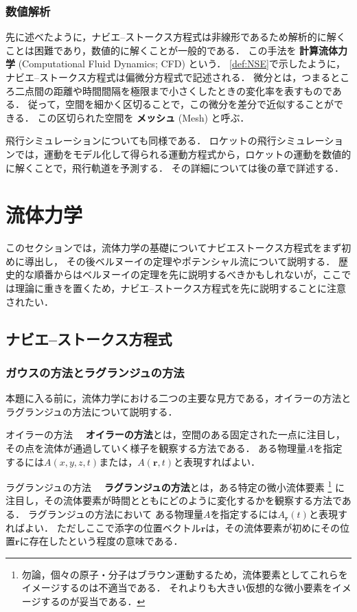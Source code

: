 \documentclass[uplatex,dvipdfmx,a4j,11pt]{jsreport}
\newcommand{\keyword}[1]{\textcolor{mainblue}{\textbf{#1}}}
\numberwithin{equation}{chapter}
\begin{document}
\subsection{数値解析}
先に述べたように，ナビエ--ストークス方程式は非線形であるため解析的に解くことは困難であり，数値的に解くことが一般的である．
この手法を \keyword{計算流体力学} (Computational Fluid Dynamics; CFD) という．
\cref{def:NSE}で示したように，ナビエ--ストークス方程式は偏微分方程式で記述される．
微分とは，つまるところ二点間の距離や時間間隔を極限まで小さくしたときの変化率を表すものである．
従って，空間を細かく区切ることで，この微分を差分で近似することができる．
この区切られた空間を \keyword{メッシュ} (Mesh) と呼ぶ．

\enskip

飛行シミュレーションについても同様である．
ロケットの飛行シミュレーションでは，運動をモデル化して得られる運動方程式から，ロケットの運動を数値的に解くことで，飛行軌道を予測する．
その詳細については後の章で詳述する．


\chapter{流体力学}

このセクションでは，流体力学の基礎についてナビエストークス方程式をまず初めに導出し，
その後ベルヌーイの定理やポテンシャル流について説明する．
歴史的な順番からはベルヌーイの定理を先に説明するべきかもしれないが，ここでは理論に重きを置くため，ナビエ--ストークス方程式を先に説明することに注意されたい．

\section{ナビエ--ストークス方程式}
\subsection{ガウスの方法とラグランジュの方法}
本題に入る前に，流体力学における二つの主要な見方である，オイラーの方法とラグランジュの方法について説明する．

\begin{definition}{オイラーの方法}{}{}
  　\keyword{オイラーの方法}とは，空間のある固定された一点に注目し，その点を流体が通過していく様子を観察する方法である．
  ある物理量$A$を指定するには$A(x,y,z,t)$または，$A(\mathbf{r},t)$と表現すればよい．
\end{definition}

\begin{definition}{ラグランジュの方法}{}{}
  　\keyword{ラグランジュの方法}とは，ある特定の微小流体要素
  \footnote{
  勿論，個々の原子・分子はブラウン運動するため，流体要素としてこれらをイメージするのは不適当である．
  それよりも大きい仮想的な微小要素をイメージするのが妥当である．
  }
  に注目し，その流体要素が時間とともにどのように変化するかを観察する方法である．
  ラグランジュの方法において
  ある物理量$A$を指定するには$A_{\mathbf{r}}(t)$と表現すればよい．
  ただしここで添字の位置ベクトル$\mathbf{r}$は，その流体要素が初めにその位置$\mathbf{r}$に存在したという程度の意味である．
\end{definition}
\end{document}
